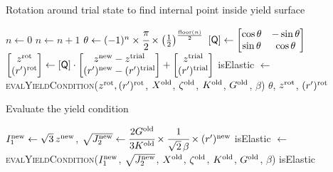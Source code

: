 \begin{breakablealgorithm}
\caption{Rotation around trial state to find internal point inside yield surface}
\begin{algorithmic}[1]
    \State $n \leftarrow 0$
    \Repeat
      \State $n \leftarrow n+1$
      \State $\theta \leftarrow (-1)^n \times \cfrac{\pi}{2} \times \left(\tfrac{1}{2}\right)^{\frac{\text{floor}(n)}{2}}$
      \State $\left[\mathsf{Q}\right] \leftarrow 
              \begin{bmatrix} \cos\theta & -\sin\theta \\ \sin\theta & \cos\theta \end{bmatrix}$
      \State $\begin{bmatrix} z^{\text{rot}} \\ (r')^{\text{rot}} \end{bmatrix} \leftarrow
              \left[\mathsf{Q}\right] \cdot \begin{bmatrix} z^{\text{new}} - z^{\text{trial}} \\ (r')^{\text{new}} - (r')^{\text{trial}} \end{bmatrix} +
              \begin{bmatrix} z^{\text{trial}} \\ (r')^{\text{trial}} \end{bmatrix}$
      \State isElastic $\leftarrow$ \textsc{evalYieldCondition}($z^{\text{rot}}, (r')^{\text{rot}}$,
                                                                $X^{\text{old}}$, $\zeta^{\text{old}}$, 
                                                                $K^{\text{old}}$, $G^{\text{old}}$, $\beta$)
    \State \Return $\theta$, $z^{\text{rot}}$, $(r')^{\text{rot}}$
  \EndProcedure
\end{algorithmic}
\end{breakablealgorithm}

\begin{breakablealgorithm}
\caption{Evaluate the yield condition}
\begin{algorithmic}[1]
     \State $I_1^{\text{new}} \leftarrow \sqrt{3}\,z^{\text{new}}$, 
            $\sqrt{J_2^{\text{new}}} \leftarrow \cfrac{2G^{\text{old}}}{3K^{\text{old}}}\times
              \cfrac{1}{\sqrt{2}\,\beta}\times(r')^{\text{new}}$
     \State isElastic $\leftarrow$ \textsc{evalYieldCondition}($I_1^{\text{new}}$, $\sqrt{J_2^{\text{new}}}$, 
                                                             $X^{\text{old}}$, $\zeta^{\text{old}}$, 
                                                             $K^{\text{old}}$, $G^{\text{old}}$, $\beta$)
     \State \Return isElastic
  \EndProcedure
\end{algorithmic}
\end{breakablealgorithm}
